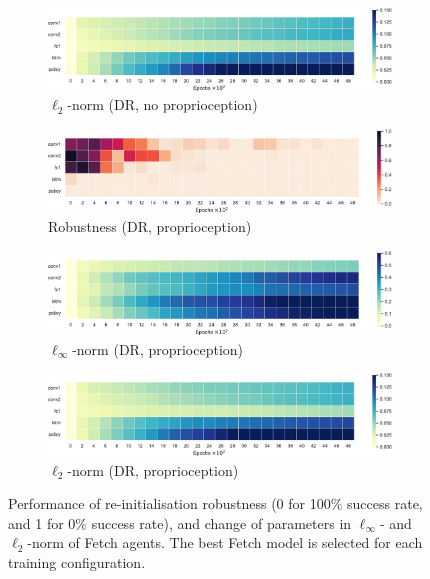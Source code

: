 \begin{figure}[h!]
\begin{subfigure}{0.32\textwidth}
  \end{subfigure}
  \begin{subfigure}{0.32\textwidth}
    \includegraphics[width=\textwidth]{figures/chapter6/robustness/fetch/visual_random/l2_dist}
    \caption{$\ell_2$-norm (DR, no proprioception)}
  \end{subfigure}
  \begin{subfigure}{0.32\textwidth}
    \includegraphics[width=\textwidth]{figures/chapter6/robustness/fetch/sensor_random/error}
    \caption{Robustness (DR, proprioception)}
  \end{subfigure}
  \begin{subfigure}{0.32\textwidth}
    \includegraphics[width=\textwidth]{figures/chapter6/robustness/fetch/sensor_random/inf_dist}
    \caption{$\ell_\infty$-norm (DR, proprioception)}
  \end{subfigure}
  \begin{subfigure}{0.32\textwidth}
    \includegraphics[width=\textwidth]{figures/chapter6/robustness/fetch/sensor_random/l2_dist}
    \caption{$\ell_2$-norm (DR, proprioception)}
  \end{subfigure}
  \caption{Performance of re-initialisation robustness (0 for 100$\%$ success rate, and 1 for 0$\%$ success rate), and change of parameters in $\ell_\infty$- and $\ell_2$-norm of Fetch agents. The best Fetch model is selected for each training configuration.}
  \label{fig:fetch_robustness}
\end{figure}
